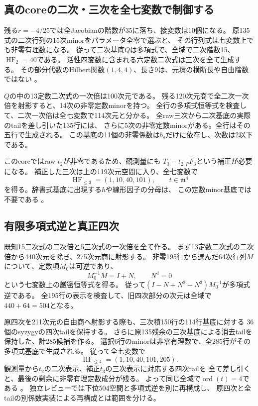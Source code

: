 \documentclass[11pt,a4paper]{ltjsarticle}
\theoremstyle{remark}
\begin{document}
\subsection{真のcoreの二次・三次を全七変数で制御する}
残る$r=-4/25$では全Jacobianの階数が35に落ち、接変数は10個になる。
原135式の二次行列の15次minorをパラメータ全零で選ぶと、
その行列式は七変数上でも非零有理数になる。
従って二次基底$Q$は多項式で、全域で二次階数15、$\operatorname{HF}_2=40$である。
活性四変数に含まれる六定数二次式は三次を全て生成する。
その部分代数のHilbert関数$(1,4,4)$、長さ9は、元環の横断長や自由階数ではない
\cite{flag-true-quad-v51}。

$Q$の中の13定数二次式の一次倍は100次元である。
残る120次元商で全二次一次倍を射影すると、14次の非零定数minorを持つ。
全行の多項式恒等式を検査して、二次一次倍は全七変数で114次元と分かる。
全raw三次から二次基底の実際のtailを差し引いた135行には、
さらに5次の非零定数minorがある。全行はその五行で生成される。
この基底の11個の非零係数は$b_8$だけに依存し、次数は2以下である。

このcoreではraw $t_2$が非零であるため、観測量にも
$T_3-t_{2,P}F_3$という補正が必要になる。
補正した三次は上の119次元空間に入り、全七変数で
\[
 \operatorname{HF}_{\le3}=(1,10,40,101),\qquad t\in\mathfrak m^4
\]
を得る。辞書式基底に出現する$h$や線形因子の分母は、
この定数minor基底では不要である
\cite{flag-true-cubic-v51}。

\subsection{有限多項式逆と真正四次}
既知15二次式の二次倍と5三次式の一次倍を全て作る。
まず13定数二次式の二次倍から440次元を除き、275次元商に射影する。
非零195行から選んだ64次行列$M$について、定数項$M_0$は可逆であり、
\[
 M_0^{-1}M=I+N,\qquad N^4=0
\]
という七変数上の厳密恒等式を得る。
従って$(I-N+N^2-N^3)M_0^{-1}$が多項式逆である。
全195行の表示を検査して、旧四次部分の次元は全域で$440+64=504$となる。

原四次を211次元の自由商へ射影する際も、三次積150行の114行基底に対する
36個のsyzygyの四次tailを保持する。
さらに原135残余の三次基底による消去tailを保持した、計285候補を作る。
選択6行のminorは非零有理数で、全285行がその多項式基底で生成される。
従って全七変数で
\[
 \operatorname{HF}_{\le4}=(1,10,40,101,205).
\]
観測量から$t_2$の二次表示、補正$t_3$の三次表示に対応する四次tailを
全て差し引くと、最後の剰余に非零有理定数成分が残る。
よって同じ全域で$\operatorname{ord}(t)=4$である
\cite{flag-true-four-v51}。
独立レビューでは下位504空間と多項式逆を別に再構成し、
原四次と全tailの別係数実装による再構成とは範囲を分ける。
\end{document}
